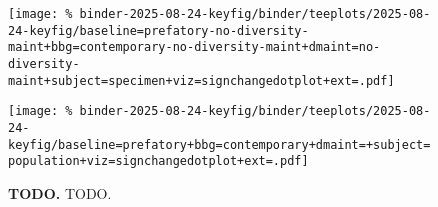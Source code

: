 \begin{figure*}

\raisebox{0.95cm}{%
  \texttt{[image: \%
binder-2025-08-24-keyfig/binder/teeplots/2025-08-24-keyfig/baseline=prefatory+bbg=contemporary+dmaint=+subject=specimen+viz=signchangedotplot+ext=.pdf]}%
}
%
\texttt{[image: \%
binder-2025-08-24-keyfig/binder/teeplots/2025-08-24-keyfig/baseline=prefatory-no-diversity-maint+bbg=contemporary-no-diversity-maint+dmaint=no-diversity-maint+subject=specimen+viz=signchangedotplot+ext=.pdf]}

\vspace{-6ex}

\texttt{[image: \%
binder-2025-08-24-keyfig/binder/teeplots/2025-08-24-keyfig/baseline=prefatory+bbg=contemporary+dmaint=+subject=population+viz=signchangedotplot+ext=.pdf]}

\vspace{-1ex}

\caption{
\textbf{TODO.}
TODO.
}
\label{fig:sign-change-prevatory-vs-contemporary}

\end{figure*}
